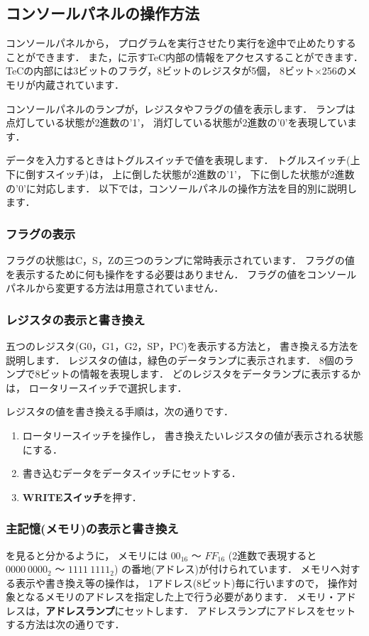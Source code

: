 \subsection{コンソールパネルの操作方法}
\label{operation}
コンソールパネルから，
プログラムを実行させたり実行を途中で止めたりすることができます．
また，に示すTeC内部の情報をアクセスすることができます．
TeCの内部には3ビットのフラグ，8ビットのレジスタが5個，
8ビット×256のメモリが内蔵されています．

コンソールパネルのランプが，レジスタやフラグの値を表示します．
ランプは点灯している状態が2進数の'1'，
消灯している状態が2進数の'0'を表現しています．

データを入力するときはトグルスイッチで値を表現します．
トグルスイッチ(上下に倒すスイッチ)は，
上に倒した状態が2進数の'1'，
下に倒した状態が2進数の'0'に対応します．
以下では，コンソールパネルの操作方法を目的別に説明します．


\subsubsection{フラグの表示}
フラグの状態はC，S，Zの三つのランプに常時表示されています．
フラグの値を表示するために何も操作をする必要はありません．
フラグの値をコンソールパネルから変更する方法は用意されていません．

\subsubsection{レジスタの表示と書き換え}
五つのレジスタ(G0，G1，G2，SP，PC)を表示する方法と，
書き換える方法を説明します．
レジスタの値は，緑色のデータランプに表示されます．
8個のランプで8ビットの情報を表現します．
どのレジスタをデータランプに表示するかは，
ロータリースイッチで選択します．
\vspace{0.3cm}

レジスタの値を書き換える手順は，次の通りです．
\begin{enumerate}
\item ロータリースイッチを操作し，
書き換えたいレジスタの値が表示される状態にする．
\item 書き込むデータをデータスイッチにセットする．
\item {\bf WRITEスイッチ}を押す．
\end{enumerate}

\subsubsection{主記憶(メモリ)の表示と書き換え}
を見ると分かるように，
メモリには $00_{16}$ 〜 $FF_{16}$
 (2進数で表現すると $0000~0000_{2}$ 〜 $1111~1111_{2}$)
の番地(アドレス)が付けられています．
メモリへ対する表示や書き換え等の操作は，
1アドレス(8ビット)毎に行いますので，
操作対象となるメモリのアドレスを指定した上で行う必要があります．
メモリ・アドレスは，{\bf アドレスランプ}にセットします．
アドレスランプにアドレスをセットする方法は次の通りです．

